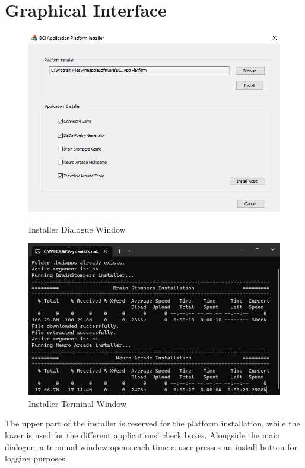 \section{Graphical Interface}
\begin{figure}[H]
    \begin{minipage}[c]{0.45\linewidth}
      \includegraphics[width=\linewidth]{Graphics/Installer GUI.png}
      \caption{Installer Dialogue Window}
      \end{minipage}
    \hfill
    \begin{minipage}[c]{0.45\linewidth}
      \includegraphics[width=\linewidth]{Graphics/Installer Terminal.png}
      \caption{Installer Terminal Window}
  \end{minipage}%
\end{figure}
The upper part of the installer is reserved for the platform installation, while the lower is used for the different applications' check boxes. Alongside the main dialogue, a terminal window opens each time a user presses an install button for logging purposes.


